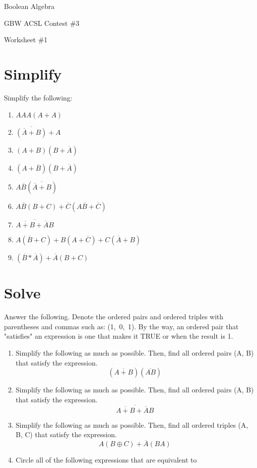 \documentclass{article}
\begin{document}
\centerline{\sc \large Boolean Algebra}
\vspace{.5pc}
\centerline{\sc GBW ACSL Contest \#3}
\vspace{.5pc}
\centerline{\sc Worksheet \#1}
\vspace{2pc}
\section{Simplify}

Simplify the following:
\begin{enumerate}
  \item $ AAA(A + A) $
  
  \item $ \overline{(\overline{A} + B)} + A $
  
  \item
  $ (A + B)(B + \overline{A}) $

  \item
  $ (A + \overline{B})(B + \overline{A}) $
  
  \item 
  $ A\overline{B}(\overline{\overline{A} + B}) $
  
  \item
  $ A \overline{B}(B + C) + 
  \overline{C} (A \overline{B} + \overline{C})$
  
  \item $ \overline{\overline{A + B} + \overline{A}B} $
  
  \item $ A(\overline{B} + C)
          + B(A + \overline{C}) 
          + C(\overline{A} + B)$
          
  \item $ (\overline{B} * \overline{A}) + \overline{A}(B + C) $
\end{enumerate}


\section{Solve}

Answer the following. Denote the ordered pairs and ordered triples with 
parentheses and commas such as: \mbox{(1, 0, 1)}.  By the way, an 
ordered pair that "satisfies" an expression is one that makes it TRUE or 
when the result is 1.

\begin{enumerate}
  \item Simplify the following as much as possible.  Then, find all ordered pairs (A, B) that satisfy the expression.
 \[ (\overline{A + B})(\overline{AB}) \]
 
 \item Simplify the following as much as possible.  Then, find all ordered pairs (A, B) that satisfy the expression.
 \[ \overline{\overline{A + B}+ \overline{A}B} \]

  \item Simplify the following as much as possible.  Then, find all ordered triples (A, B, C) that satisfy the expression. 
  \[ A(B\oplus{}C) + \overline{A}(BA)\]
  
  \item Circle all of the following expressions that are equivalent to 
  
\end{enumerate}
\end{document}
